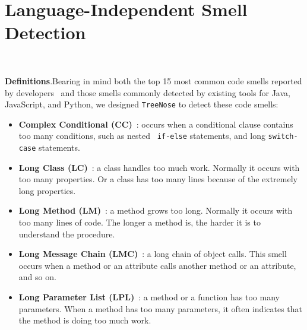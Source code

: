 


\vspace*{-0.5em}

\section{Language-Independent Smell Detection}~\label{sec:approach}

\vspace*{-1em}


{\bf Definitions}.Bearing in mind both the top 15 most common code smells
reported by developers~\cite{developersCare} and those smells commonly detected
by existing tools for Java, JavaScript, and Python, we designed
\texttt{TreeNose} to detect these code smells:

\begin{itemize}[leftmargin=*]
	\item \textbf{Complex Conditional (CC)}~\cite{Fowler_Beck}: occurs when a
	      conditional clause contains too many conditions, such as nested {\tt
			      if-else} statements, and long {\tt switch-case} statements.
	\item \textbf{Long Class (LC)}~\cite{Fowler_Beck}: a class handles too much
	      work. Normally it occurs with too many properties. Or a class has too
	      many lines because of the extremely long properties.
	\item \textbf{Long Method (LM)}~\cite{Fowler_Beck}: a method grows too long.
	      Normally it occurs with too many lines of code. The longer a method is,
	      the harder it is to understand the procedure.
	\item \textbf{Long Message Chain (LMC)}~\cite{Fowler_Beck}: a long chain of
	      object calls. This smell occurs when a method or an attribute calls
	      another method or an attribute, and so on.
	\item \textbf{Long Parameter List (LPL)}~\cite{Fowler_Beck}: a method or a
	      function has too many parameters. When a method has too many parameters,
	      it often indicates that the method is doing too much work.
\end{itemize}

